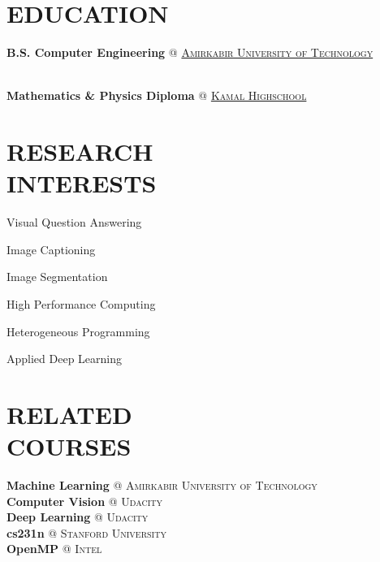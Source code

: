 \documentclass[margin, 10pt]{res} %
\begin{document}
    \begin{resume}
    
     
    \section{EDUCATION}  
    \textbf{B.S. Computer Engineering} \textsc{@}
	   \href{http://aut.ac.ir/aut/}{\textsc{Amirkabir University of Technology}}\\
	   {}\hfill {}\\

 	\vspace{0.1cm}
 	
    \textbf{Mathematics \& Physics Diploma} \textsc{@}
    \href{http://www.kamal.sch.ir/}{\textsc{Kamal Highschool}}\hfill {}

   
	\section{RESEARCH \\ INTERESTS}
	\vspace{0.6cm}
		  	
	 \begin{innerlist}
	\begin{minipage}{0.4\linewidth}
		\item Visual Question Answering
		\item Image Captioning
		\item Image Segmentation
	\end{minipage}
	\begin{minipage}{0.4\linewidth}	
		\item High Performance Computing
		\item Heterogeneous Programming
		\item Applied Deep Learning
	\end{minipage}
\end{innerlist}
		\vspace{0.2cm}
		
  	\section{RELATED \\ COURSES}
	\textbf{Machine Learning} \textsc{@} \textsc{Amirkabir University of Technology}\\
	\textbf{Computer Vision} \textsc{@} \textsc{Udacity}\\
	\textbf{Deep Learning} \textsc{@} \textsc{Udacity}\\
	\textbf{cs231n} \textsc{@} \textsc{Stanford University}\\
	\textbf{OpenMP} \textsc{@} \textsc{Intel}\\

\end{resume}
\end{document}
